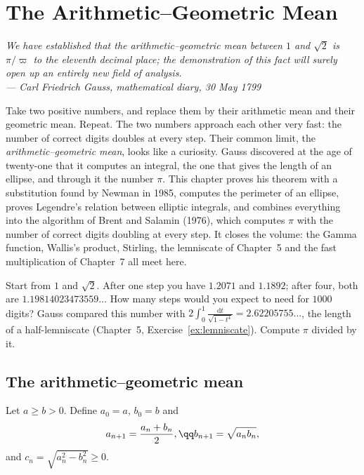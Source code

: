 \chapter{The Arithmetic--Geometric Mean}

\begin{center}\itshape
We have established that the arithmetic--geometric mean between $1$ and $\sqrt2$ is $\pi/\varpi$ to the eleventh decimal place; the
demonstration of this fact will surely open up an entirely new field of analysis.\\
\upshape --- Carl Friedrich Gauss, mathematical diary, 30 May 1799
\end{center}

Take two positive numbers, and replace them by their arithmetic mean and their geometric mean. Repeat. The two numbers approach
each other very fast: the number of correct digits doubles at every step. Their common limit, the \emph{arithmetic--geometric mean}, looks like
a curiosity. Gauss discovered at the age of twenty-one that it computes an integral, the one that gives the length of an ellipse, and through it the
number $\pi$. This chapter proves his theorem with a substitution found by Newman in 1985, computes the perimeter of an ellipse, proves
Legendre's relation between elliptic integrals, and combines everything into the algorithm of Brent and Salamin (1976), which computes $\pi$
with the number of correct digits doubling at every step. It closes the volume: the Gamma function, Wallis's product, Stirling, the lemniscate of
Chapter~5 and the fast multiplication of Chapter~7 all meet here.

\begin{think}
Start from $1$ and $\sqrt2$. After one step you have $1.2071$ and $1.1892$; after four, both are $1.19814023473559\ldots$ How many steps would you
expect to need for $1000$ digits? Gauss compared this number with $2\int_0^1\frac{\mathrm dt}{\sqrt{1-t^4}}=2.62205755\ldots$, the length of a half-lemniscate
(Chapter~5, Exercise~\ref{ex:lemniscate}). Compute $\pi$ divided by it.
\end{think}

\section{The arithmetic--geometric mean}

Let $a\ge b>0$. Define $a_0=a$, $b_0=b$ and
\[
\begin{gathered}a_{n+1}=\frac{a_n+b_n}2,\qq b_{n+1}=\sqrt{a_nb_n},\end{gathered}
\]
and $c_n=\sqrt{a_n^2-b_n^2}\ge0$.

